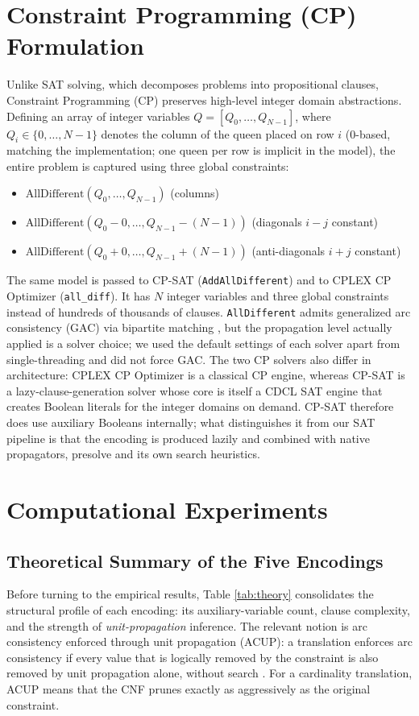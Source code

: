 \documentclass[a4paper,fleqn]{cas-sc}
\begin{document}
\section{Constraint Programming (CP) Formulation}
Unlike SAT solving, which decomposes problems into propositional clauses, Constraint Programming (CP) preserves high-level integer domain abstractions. Defining an array of integer variables $Q = [Q_0, \dots, Q_{N-1}]$, where $Q_i \in \{0, \dots, N-1\}$ denotes the column of the queen placed on row $i$ (0-based, matching the implementation; one queen per row is implicit in the model), the entire problem is captured using three global constraints:
\begin{itemize}
    \setlength{\itemsep}{1pt}
    \setlength{\parskip}{0pt}
    \item $\mathrm{AllDifferent}(Q_0, \dots, Q_{N-1})$ \hfill (columns)
    \item $\mathrm{AllDifferent}(Q_0 - 0, \dots, Q_{N-1} - (N-1))$ \hfill (diagonals $i - j$ constant)
    \item $\mathrm{AllDifferent}(Q_0 + 0, \dots, Q_{N-1} + (N-1))$ \hfill (anti-diagonals $i + j$ constant)
\end{itemize}
The same model is passed to CP-SAT (\texttt{AddAllDifferent}) and to CPLEX CP Optimizer (\texttt{all\_diff}). It has $N$ integer variables and three global constraints instead of hundreds of thousands of clauses. \texttt{AllDifferent} admits generalized arc consistency (GAC) via bipartite matching \cite{regin1994filtering}, but the propagation level actually applied is a solver choice; we used the default settings of each solver apart from single-threading and did not force GAC. The two CP solvers also differ in architecture: CPLEX CP Optimizer is a classical CP engine, whereas CP-SAT is a lazy-clause-generation solver whose core is itself a CDCL SAT engine that creates Boolean literals for the integer domains on demand. CP-SAT therefore does use auxiliary Booleans internally; what distinguishes it from our SAT pipeline is that the encoding is produced lazily and combined with native propagators, presolve and its own search heuristics.

\section{Computational Experiments}
\subsection{Theoretical Summary of the Five Encodings}
Before turning to the empirical results, Table \ref{tab:theory} consolidates the structural profile of each encoding: its auxiliary-variable count, clause complexity, and the strength of \emph{unit-propagation} inference. The relevant notion is arc consistency enforced through unit propagation (ACUP): a translation enforces arc consistency if every value that is logically removed by the constraint is also removed by unit propagation alone, without search \cite{gent2002arc,bailleux2003efficient}. For a cardinality translation, ACUP means that the CNF prunes exactly as aggressively as the original constraint.
\end{document}
